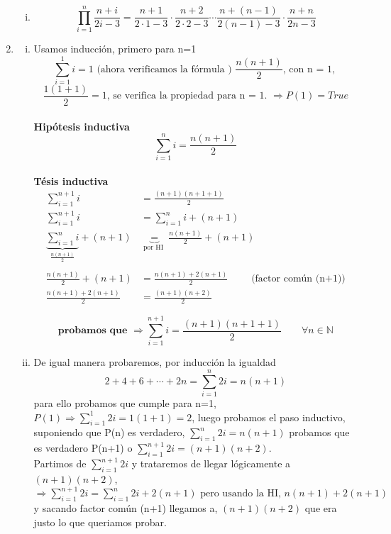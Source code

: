 \documentclass[12pt]{book}
\begin{document}
\begin{enumerate}
\begin{enumerate}[i)]
	\item 
\[
\prod_{i=1}^{n}\frac{n+i}{2i-3} = \frac{n+1}{2\cdot 1-3} \cdot \frac{n+2}{2\cdot2 - 3} \cdots  \frac{n+(n-1)}{2(n-1)-3}\cdot \frac{n+n}{2n-3}
\]
		
	\end{enumerate}

\item %

	\begin{enumerate}[i)]
	\item Usamos inducci\'on, primero para n=1
	\[ \sum_{i=1}^{1} i = 1 \text{ (ahora verificamos la f\'ormula ) } \frac{n(n+1)}{2} \text{, con n = 1, } \] 
	\[ \frac{1(1+1)}{2} = 1 \text{, se verifica la propiedad para n = 1. }	\Rightarrow P(1) = True\]
\\
\textbf{Hip\'otesis inductiva} \[ \sum_{i=1}^{n} i = \frac{n(n+1)}{2}\]
\\
\textbf{T\'esis inductiva} 
\begin{align*}
\sum_{i=1}^{n+1}i &= \frac{(n+1)(n+1+1)}{2} \\
\sum_{i=1}^{n+1}i &= \sum_{i=1}^{n}i + (n+1)\\
\underbrace{\sum_{i=1}^{n}i}_{\frac{n(n+1)}{2}} + (n+1) & \underbrace{=}_{ \text{por HI }} \frac{n(n+1)}{2} + (n+1) \\ \\
\frac{n(n+1)}{2} + (n+1) &= \frac{n(n+1) + 2(n+1)}{2} \qquad \text{ (factor com\'un (n+1))} \\
\frac{n(n+1) + 2(n+1)}{2} &= \frac{(n+1)(n+2)}{2} 
\end{align*}
\begin{shaded}
\[ \textbf{probamos que }\Rightarrow \sum_{i=1}^{n+1}i = \frac{(n+1)(n+1+1)}{2} \qquad \forall n \in \mathbb{N} \]
\end{shaded}
	\item De igual manera probaremos, por inducci\'on la igualdad \[ 2+4+6+\cdots+2n = \sum_{i=1}^{n} 2i = n(n+1)\] para ello probamos que cumple para n=1, $ P(1) \Rightarrow \sum_{i=1}^{1} 2i = 1(1+1) = 2$, luego probamos el paso inductivo, suponiendo que P(n) es verdadero, $\sum_{i=1}^{n} 2i = n(n+1)$ probamos que es verdadero P(n+1) o $ \sum_{i=1}^{n+1} 2i = (n+1)(n+2) $.\\
Partimos de $\sum_{i=1}^{n+1} 2i$ y trataremos de llegar l\'ogicamente a $ (n+1)(n+2) $,\\
 $ \Rightarrow \sum_{i=1}^{n+1} 2i = \sum_{i=1}^{n} 2i + 2(n+1) \text{ pero usando la HI, } n(n+1)+2(n+1)$ y sacando factor com\'un (n+1) llegamos a, $ (n+1)(n+2)$ 	que era justo lo que queriamos probar.
	\end{enumerate}


\end{enumerate}
\end{document}
